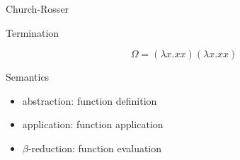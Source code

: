 \documentclass{beamer}
\begin{document}
\begin{frame}{Church-Rosser}
\begin{center}
\end{center}
\end{frame}
\begin{frame}{Termination}
\begin{center}
$$\Omega = (\lambda x.xx) (\lambda x.xx)$$
\end{center}
\end{frame}
\begin{frame}{Semantics}
\begin{itemize}
\item abstraction: function definition
\item application: function application
\item $\beta$-reduction: function evaluation 
\end{itemize}
\end{frame}
\end{document}
